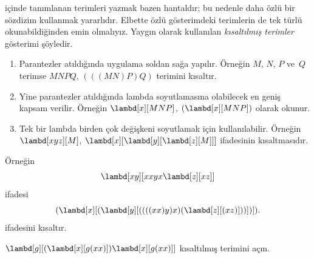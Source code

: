 


 içinde tanımlanan terimleri yazmak bazen hantaldır;
bu nedenle daha özlü bir sözdizim kullanmak yararlıdır. Elbette özlü
gösterimdeki terimlerin de tek türlü okunabildiğinden emin olmalıyız. Yaygın
olarak kullanılan \emph{kısaltılmış terimler} gösterimi şöyledir.

\begin{enumerate}
\item Parantezler atıldığında uygulama soldan sağa yapılır. Örneğin $M$,
  $N$, $P$ ve~$Q$ terimse $MNPQ$, $(((MN)P)Q)$ terimini kısaltır.
\item Yine parantezler atıldığında lambda soyutlamasına olabilecek en geniş
  kapsam verilir. Örneğin $\lambd[x][MNP]$, $(\lambd[x][MNP])$ olarak
  okunur.
\item Tek bir lambda birden çok değişkeni soyutlamak için kullanılabilir.
  Örneğin $\lambd[xyz][M]$,
  $\lambd[x][\lambd[y][\lambd[z][M]]]$ ifadesinin kısaltmasıdır.
\end{enumerate}

Örneğin
\[
\lambd[xy][xxyx \lambd[z][xz]]
\]
ifadesi
\[
(\lambd[x][(\lambd[y][((((xx)y)x)(\lambd[z][(xz)]))])]).
\]
ifadesini kısaltır.

\begin{prob}
$\lambd[g][(\lambd[x][g (x x)])
  \lambd[x][g (x x)]]$ kısaltılmış terimini açın.
\end{prob}

